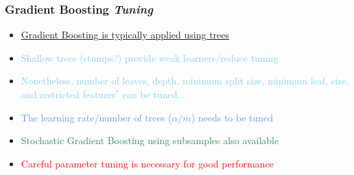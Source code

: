 \documentclass[xcolor={dvipsnames}]{beamer}
\begin{document}
\frame
{
 \frametitle{Gradient Boosting \emph{Tuning}}
\begin{itemize}
\item[] \underline{Gradient Boosting is typically applied using trees} 
\item<2-> \textcolor{SkyBlue}{Shallow trees (stumps?) provide weak learners/reduce tuning}
\item<3-> \textcolor{SkyBlue}{Nonetheless, number of leaves, depth, minimum split size, minimum leaf, size, and restricted features$^*$ can be tuned...} 
\item<4-> \textcolor{CornflowerBlue}{The learning rate/number of trees ($\alpha/m$) needs to be tuned}
\item<5-> \textcolor{SeaGreen}{Stochastic Gradient Boosting using subsamples also available}
\item<6-> \textcolor{red}{Careful parameter tuning is necessary for good performance}\\${}$\\
\end{itemize}
\begin{figure}
\centering
\vspace{-.75in}

\vspace{-1.75in}

\vspace{-1.5in}

\end{figure}
}
\end{document}
